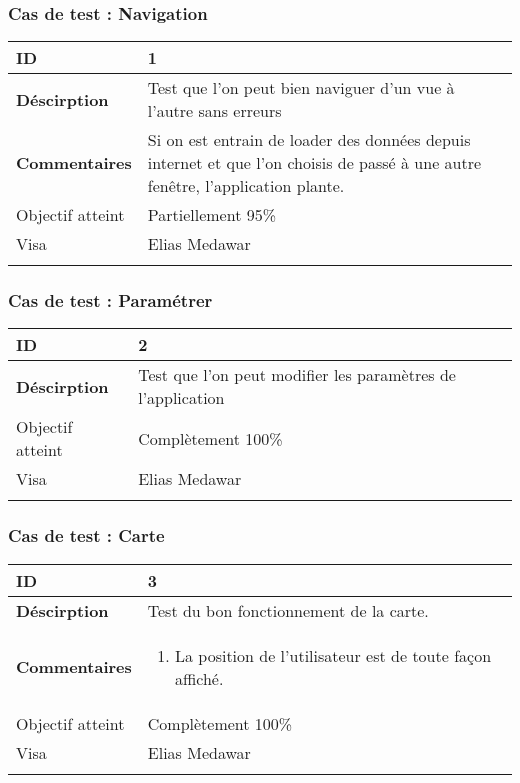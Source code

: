 		 		\subsubsection*{Cas de test : Navigation}
		 				 \begin{longtable}{m{4cm}|p{10cm}|}
		 				 \textbf{ ID} & 1 \\
		 				 \hline \textbf{Déscirption} & Test que l'on peut bien naviguer d'un vue à l'autre sans erreurs\\
		 				 \hline \textbf{Commentaires} & Si on est entrain de loader des données depuis internet et que l'on choisis de passé à une autre fenêtre, l'application plante. \\
		 				 \hline Objectif  atteint & {\color{orange} Partiellement 95\% \CheckedBox } \\
		 				\hline Visa & Elias Medawar \\	
		 				 \\
		 			 \end{longtable} 
		  		\subsubsection*{Cas de test : Paramétrer}
		 		 \begin{longtable}{m{4cm}|p{10cm}|}
		 		 \textbf{ ID} & 2 \\
		 		 \hline \textbf{Déscirption} & Test que l'on peut modifier les paramètres de l'application\\
		  				\hline Objectif atteint &  {\color{green}Complètement 100\% \CheckedBox} \\
		  				\hline Visa & Elias Medawar 	\\
		 		 \\
		 		  \end{longtable} 		 		 
		 		 \subsubsection*{Cas de test : Carte}
		 		 		 \begin{longtable}{m{4cm}|p{10cm}|}
		 		 		 \textbf{ ID} & 3 \\
		 		 		 \hline \textbf{Déscirption} &  Test du bon fonctionnement de la carte.\\
		 		 		 \hline \textbf{Commentaires} &  
		 		 		 	 	 \begin{enumerate}
	 		 		 		 	 		\item La position de l'utilisateur est de toute façon affiché.
	 		 		 		 	\end{enumerate} \\
	 		 		 	\hline Objectif atteint & {\color{green} Complètement  100\% \CheckedBox } \\
	 		 		 	\hline Visa & Elias Medawar 	\\
		 		 		 \\
		 		 \end{longtable} 
